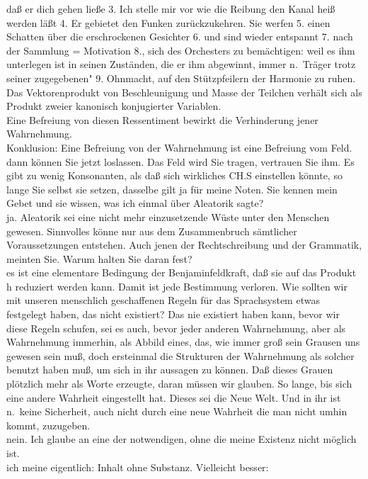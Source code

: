 \documentclass[
]{article}
\begin{document}
daß er dich gehen ließe 3. Ich stelle mir vor wie die Reibung den Kanal
heiß werden läßt 4. Er gebietet den Funken zurückzukehren. Sie werfen 5.
einen Schatten über die erschrockenen Gesichter 6. und sind wieder
entspannt 7. nach der Sammlung = Motivation 8., sich des Orchesters zu
bemächtigen: weil es ihm unterlegen ist in seinen Zuständen, die er ihm
abgewinnt, immer n.~Träger trotz seiner zugegebenen" 9. Ohnmacht, auf
den Stützpfeilern der Harmonie zu ruhen.\\
Das Vektorenprodukt von Beschleunigung und Masse der Teilchen verhält
sich als Produkt zweier kanonisch konjugierter Variablen.\\
Eine Befreiung von diesen Ressentiment bewirkt die Verhinderung jener
Wahrnehmung.\\
Konklusion: Eine Befreiung von der Wahrnehmung ist eine Befreiung vom
Feld.\\
dann können Sie jetzt loslassen. Das Feld wird Sie tragen, vertrauen Sie
ihm. Es gibt zu wenig Konsonanten, als daß sich wirkliches CH.S
einstellen könnte, so lange Sie selbst sie setzen, dasselbe gilt ja für
meine Noten. Sie kennen mein Gebet und sie wissen, was ich einmal über
Aleatorik sagte?\\
ja. Aleatorik sei eine nicht mehr einzusetzende Wüste unter den Menschen
gewesen. Sinnvolles könne nur aus dem Zusammenbruch sämtlicher
Voraussetzungen entstehen. Auch jenen der Rechtschreibung und der
Grammatik, meinten Sie. Warum halten Sie daran fest?\\
es ist eine elementare Bedingung der Benjaminfeldkraft, daß sie auf das
Produkt h reduziert werden kann. Damit ist jede Bestimmung verloren. Wie
sollten wir mit unseren menschlich geschaffenen Regeln für das
Sprachsystem etwas festgelegt haben, das nicht existiert? Das nie
existiert haben kann, bevor wir diese Regeln schufen, sei es auch, bevor
jeder anderen Wahrnehmung, aber als Wahrnehmung immerhin, als Abbild
eines, das, wie immer groß sein Grausen uns gewesen sein muß, doch
ersteinmal die Strukturen der Wahrnehmung als solcher benutzt haben muß,
um sich in ihr aussagen zu können. Daß dieses Grauen plötzlich mehr als
Worte erzeugte, daran müssen wir glauben. So lange, bis sich eine andere
Wahrheit eingestellt hat. Dieses sei die Neue Welt. Und in ihr ist
n.~keine Sicherheit, auch nicht durch eine neue Wahrheit die man nicht
umhin kommt, zuzugeben.\\
nein. Ich glaube an eine der notwendigen, ohne die meine Existenz nicht
möglich ist.\\
ich meine eigentlich: Inhalt ohne Substanz. Vielleicht besser:
\end{document}
